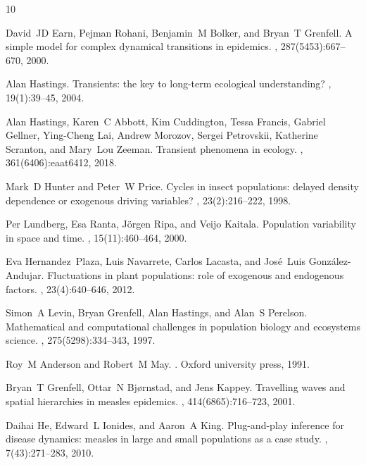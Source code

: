 \documentclass[12pt]{article}
\begin{document}
\begin{thebibliography}{10}

David~JD Earn, Pejman Rohani, Benjamin~M Bolker, and Bryan~T Grenfell.
\newblock A simple model for complex dynamical transitions in epidemics.
, 287(5453):667--670, 2000.

Alan Hastings.
\newblock Transients: the key to long-term ecological understanding?
, 19(1):39--45, 2004.

Alan Hastings, Karen~C Abbott, Kim Cuddington, Tessa Francis, Gabriel Gellner, Ying-Cheng Lai, Andrew Morozov, Sergei Petrovskii, Katherine Scranton, and Mary~Lou Zeeman.
\newblock Transient phenomena in ecology.
, 361(6406):eaat6412, 2018.

Mark~D Hunter and Peter~W Price.
\newblock Cycles in insect populations: delayed density dependence or exogenous driving variables?
, 23(2):216--222, 1998.

Per Lundberg, Esa Ranta, J{\"o}rgen Ripa, and Veijo Kaitala.
\newblock Population variability in space and time.
, 15(11):460--464, 2000.

Eva Hernandez~Plaza, Luis Navarrete, Carlos Lacasta, and Jos{\'e}~Luis Gonz{\'a}lez-Andujar.
\newblock Fluctuations in plant populations: role of exogenous and endogenous factors.
, 23(4):640--646, 2012.

Simon~A Levin, Bryan Grenfell, Alan Hastings, and Alan~S Perelson.
\newblock Mathematical and computational challenges in population biology and ecosystems science.
, 275(5298):334--343, 1997.

Roy~M Anderson and Robert~M May.
.
\newblock Oxford university press, 1991.

Bryan~T Grenfell, Ottar~N Bj{\o}rnstad, and Jens Kappey.
\newblock Travelling waves and spatial hierarchies in measles epidemics.
, 414(6865):716--723, 2001.

Daihai He, Edward~L Ionides, and Aaron~A King.
\newblock Plug-and-play inference for disease dynamics: measles in large and small populations as a case study.
, 7(43):271--283, 2010.


\end{thebibliography}
\end{document}
